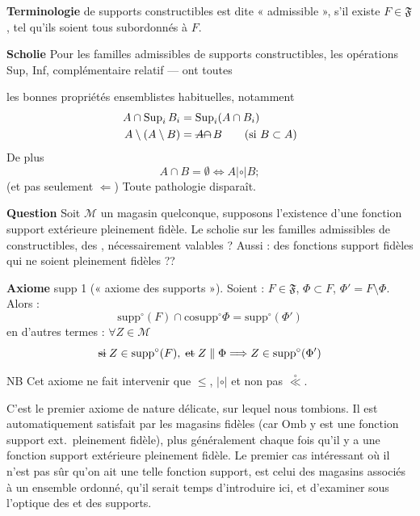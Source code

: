 \documentclass[11pt,a4paper]{article}
\begin{document}
\textbf{Terminologie}  de supports constructibles  est dite « admissible », s'il existe $F\in\mathfrak{F}$, tel qu'ils soient tous subordonnés à $F$. 

\textbf{Scholie} Pour les familles admissibles de supports constructibles, les opérations Sup, Inf, complémentaire relatif — ont toutes


les bonnes propriétés  ensemblistes habituelles, notamment
\[
\begin{aligned}
A \cap \operatorname{Sup}_i B_i &= \operatorname{Sup}_i (A\cap B_i)\\
A \setminus (A\setminus B) &= \text{\struck{$A\cap$}}\, B \qquad (\text{si } B\subset A)
\end{aligned}
\]
De plus 
\[
A\cap B = \emptyset \Longleftrightarrow A \mathrel{|{\circ}|} B ;
\]
(et pas seulement $\Leftarrow$) Toute pathologie disparaît.

\textbf{Question} Soit $\mathcal{M}$ un magasin quelconque, \struck{\ill{}} supposons l'existence d'une fonction support extérieure pleinement fidèle. Le scholie sur les familles admissibles de  constructibles, \struck{\ill{}}  \ill{} des  \ill{},  nécessairement valables ?
Aussi :  des fonctions support fidèles  qui ne soient pleinement fidèles ??

\textbf{Axiome}  supp 1 (« axiome des supports »). Soient : $F\in\mathfrak{F}$, $\Phi\subset F$, $\Phi' = F\setminus\Phi$. Alors :
\[
\mathrm{supp}^\circ(F) \cap \mathrm{cosupp}^\circ\Phi = \mathrm{supp}^\circ(\Phi')
\]
en d'autres termes : $\forall Z\in\mathcal{M}$
\[
\text{\struck{si}}\; Z \in \mathrm{supp}^\circ(F),\; \text{\struck{et}}\; Z \parallel \Phi \Longrightarrow Z \in \mathrm{supp}^\circ(\Phi')
\]

NB Cet axiome ne fait intervenir que $\le$, $|{\circ}|$ \ill{} et non pas $\overset{\circ}{\ll}$.


C'est le premier axiome de nature délicate, sur lequel nous tombions. Il est automatiquement satisfait par les magasins fidèles (car $\mathrm{Omb}$ y est une fonction support ext.\ pleinement fidèle), plus généralement chaque fois qu'il y a une fonction support extérieure pleinement fidèle. Le premier cas intéressant où il n'est pas sûr qu'on ait une telle fonction support, est celui des magasins associés à un \struck{\ill{}} ensemble ordonné, qu'il serait temps d'introduire ici, et d'examiner sous l'optique des  et des supports.
\end{document}
